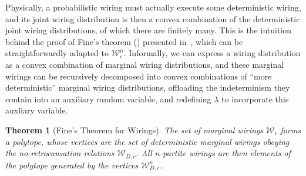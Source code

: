 \documentclass[10pt, a4paper]{article}
\numberwithin{equation}{section} %
\newcounter{stmt} %
\theoremstyle{definition}
\theoremstyle{plain}
\newtheorem{theorem}[stmt]{Theorem}
\newcommand{\?}{\mathrel{?}} %
\newcommand{\sW}{\mathcal{W}}
\begin{document}
                Physically, a probabilistic wiring must actually execute some deterministic wiring, and its joint wiring distribution is then a convex combination of the deterministic joint wiring distributions, of which there are finitely many. This is the intuition behind the proof of Fine's theorem () presented in~\cite{BellNonlocality}, which can be straightforwardly adapted to \(\sW_c^n\). Informally, we can express a wiring distribution as a convex combination of marginal wiring distributions, and these marginal wirings can be recursively decomposed into convex combinations of ``more deterministic'' marginal wiring distributions, offloading the indeterminism they contain into an auxiliary random variable, and redefining \(\lambda\) to incorporate this auxliary variable.
                \begin{theorem}[Fine's Theorem for Wirings]
                  The set of marginal wirings \(\sW_c\) forms a polytope, whose vertices are the set of deterministic marginal wirings obeying the no-retrocausation relations \(\sW_{D,c}\). All \(n\)-partite wirings are then elements of the polytope generated by the vertices \(\sW_{D,c}^n\).
              \end{theorem}
\end{document}
